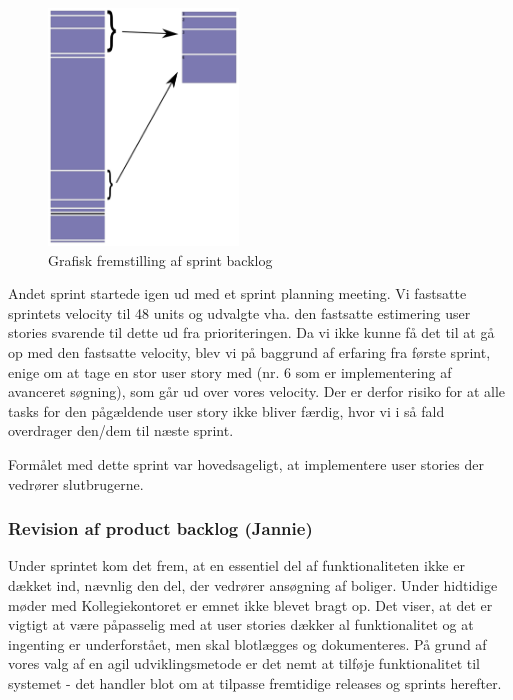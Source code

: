 \documentclass[12pt, a4paper]{report}
\begin{document}
\begin{figure}
\vspace{-1cm}
\begin{center}
\includegraphics[width=0.45\textwidth]{sprint2log}
\end{center}
\caption{Grafisk fremstilling af sprint backlog}
\label{sprintlog2}
\end{figure}

Andet sprint startede igen ud med et sprint planning meeting. Vi fastsatte sprintets velocity til 48 units og udvalgte vha. den fastsatte estimering user stories svarende til dette ud fra prioriteringen. Da vi ikke kunne få det til at gå op med den fastsatte velocity, blev vi på baggrund af erfaring fra første sprint, enige om at tage en stor user story med (nr. 6 som er implementering af avanceret søgning), som går ud over vores velocity. Der er derfor risiko for at alle tasks for den pågældende user story ikke bliver færdig, hvor vi i så fald overdrager den/dem til næste sprint.

Formålet med dette sprint var hovedsageligt, at implementere user stories der vedrører slutbrugerne.

\subsubsection{Revision af product backlog (Jannie)}

Under sprintet kom det frem, at en essentiel del af funktionaliteten ikke er dækket ind, nævnlig den del, der vedrører ansøgning af boliger. Under hidtidige møder med Kollegiekontoret er emnet ikke blevet bragt op. Det viser, at det er vigtigt at være påpasselig med at user stories dækker al funktionalitet og at ingenting er underforstået, men skal blotlægges og dokumenteres. På grund af vores valg af en agil udviklingsmetode er det nemt at tilføje funktionalitet til systemet - det handler blot om at tilpasse fremtidige releases og sprints herefter.
\end{document}
